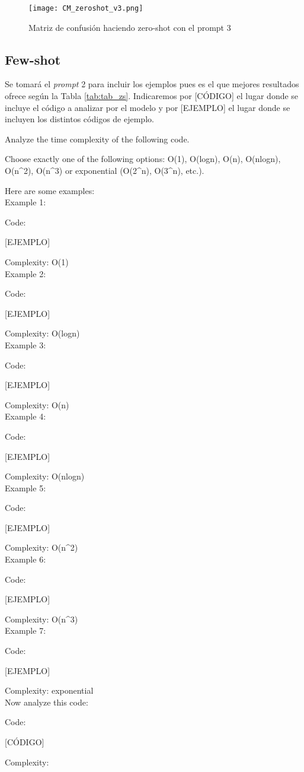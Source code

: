 \documentclass[12pt,twoside]{article}
\begin{document}
\begin{figure}[H]
  \centering
    \texttt{[image: CM\_zeroshot\_v3.png]}
  \caption{Matriz de confusión haciendo zero-shot con el prompt 3}
  \label{fig:confmat_zs3}
\end{figure}

\subsection{Few-shot}
Se tomará el \textit{prompt} 2 para incluir los ejemplos pues es el que mejores resultados ofrece según la Tabla \ref{tab:tab_zs}. Indicaremos por [CÓDIGO] el lugar donde se incluye el código a analizar por el modelo y por [EJEMPLO] el lugar donde se incluyen los distintos códigos de ejemplo.

\begin{tcolorbox}[
  colback=gray!5,
  colframe=black,
  boxrule=0.5pt,
  breakable,
  title=Prompt few-shot,
]
Analyze the time complexity of the following code.

Choose exactly one of the following options: O(1), O(logn), O(n), O(nlogn), O(n\textasciicircum2), O(n\textasciicircum3) or exponential (O(2\textasciicircum n), O(3\textasciicircum n), etc.).

Here are some examples:
\\[\baselineskip]
Example 1:

Code:

[EJEMPLO]

Complexity: O(1)
\\[\baselineskip]
Example 2:

Code:

[EJEMPLO]

Complexity: O(logn)
\\[\baselineskip]
Example 3:

Code:

[EJEMPLO]

Complexity: O(n)
\\[\baselineskip]
Example 4:

Code:

[EJEMPLO]

Complexity: O(nlogn)
\\[\baselineskip]
Example 5:

Code:

[EJEMPLO]

Complexity: O(n\textasciicircum2)
\\[\baselineskip]
Example 6:

Code:

[EJEMPLO]

Complexity: O(n\textasciicircum3)
\\[\baselineskip]
Example 7:

Code:

[EJEMPLO]

Complexity: exponential
\\[\baselineskip]
Now analyze this code:

Code:

[CÓDIGO]

Complexity:
\end{tcolorbox}
\end{document}
